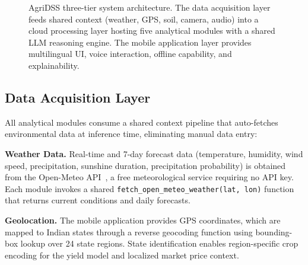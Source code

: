 \documentclass[conference]{IEEEtran}
\begin{document}
\begin{figure}[htbp]
\caption{AgriDSS three-tier system architecture. The data acquisition layer feeds shared context (weather, GPS, soil, camera, audio) into a cloud processing layer hosting five analytical modules with a shared LLM reasoning engine. The mobile application layer provides multilingual UI, voice interaction, offline capability, and explainability.}
\label{fig:architecture}
\end{figure}

\subsection{Data Acquisition Layer}

All analytical modules consume a shared context pipeline that auto-fetches environmental data at inference time, eliminating manual data entry:

\textbf{Weather Data.} Real-time and 7-day forecast data (temperature, humidity, wind speed, precipitation, sunshine duration, precipitation probability) is obtained from the Open-Meteo API~\cite{b20}, a free meteorological service requiring no API key. Each module invokes a shared \texttt{fetch\_open\_meteo\_weather(lat, lon)} function that returns current conditions and daily forecasts.

\textbf{Geolocation.} The mobile application provides GPS coordinates, which are mapped to Indian states through a reverse geocoding function using bounding-box lookup over 24 state regions. State identification enables region-specific crop encoding for the yield model and localized market price context.
\end{document}
